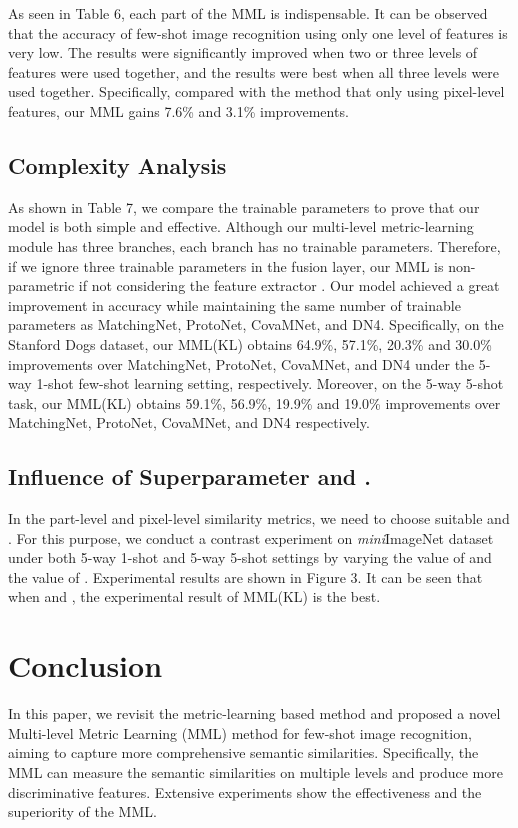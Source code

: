 \documentclass[10pt,twocolumn,letterpaper]{article}
\begin{document}
As seen in Table 6, each part of the MML is indispensable. It can be observed that the accuracy of few-shot image recognition using only one level of features is very low. The results were significantly improved when two or three levels of features were used together, and the results were best when all three levels were used together. Specifically, compared with the method that only using pixel-level features, our MML gains 7.6\% and 3.1\% improvements.

\subsection{Complexity Analysis }

As shown in Table 7, we compare the trainable parameters to prove that our model is both simple and effective.
Although our multi-level metric-learning module has three branches, each branch has no trainable parameters. 
Therefore, if we ignore three trainable parameters in the fusion layer, our MML is non-parametric if not considering the feature extractor . Our model achieved a great improvement in accuracy while maintaining the same number of trainable parameters as MatchingNet, ProtoNet, CovaMNet, and DN4. Specifically, on the Stanford Dogs dataset, our MML(KL) obtains 64.9\%, 57.1\%, 20.3\% and 30.0\% improvements over MatchingNet, ProtoNet, CovaMNet, and DN4 under the 5-way 1-shot few-shot learning setting, respectively. Moreover, on the 5-way 5-shot task, our MML(KL) obtains 59.1\%, 56.9\%, 19.9\% and 19.0\% improvements over MatchingNet, ProtoNet, CovaMNet, and DN4 respectively.

\subsection{Influence of Superparameter  and  .}
In the part-level and pixel-level similarity metrics, we need to choose suitable  and . For this purpose, we conduct a contrast experiment on \emph{mini}ImageNet dataset under both 5-way 1-shot and 5-way 5-shot settings by varying the value of  and the value of .
Experimental results are shown in Figure 3. It can be seen that when  and ,  the experimental result of MML(KL) is the best.

\section{Conclusion}
In this paper, we revisit the metric-learning based method and proposed a novel Multi-level Metric Learning (MML) method for few-shot image recognition, aiming to capture more comprehensive semantic similarities. Specifically, the MML can measure the semantic similarities on multiple levels and produce more discriminative features. Extensive experiments show the effectiveness and the superiority of the MML.

{\small
	
	
}


\clearpage
\end{document}

